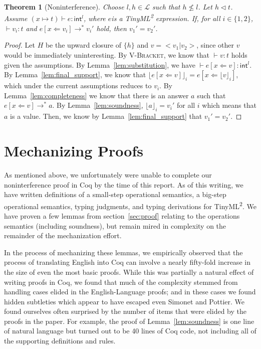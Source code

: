\documentclass[a4paper,twocolumn]{article}
\newcommand{\langName}[0]{TinyML\textsuperscript{2}}
\newcommand{\typeRule}[3]{#1 \vdash #2 \colon #3}
\newcommand{\guards}[0]{\lhd}
\newcommand{\lift}[1]{\lfloor #1 \rfloor}
\theoremstyle{plain}
\newtheorem{thm}{Theorem}
\theoremstyle{definition}
\begin{document}
\begin{thm}[Noninterference]
  Choose $l, h \in \mathcal{L}$ such that $h \not\leq l$.  Let $h \guards t$.
  Assume $\typeRule{(x \mapsto t)}{e}{\textsf{int}^l}$, where $e$is a \langName
  expression.  If, for all $i \in \{1, 2\}$, $\typeRule{ }{v_i}{t}$ and $e[x
  \Leftarrow v_i] \to^* v_i'$ hold, then $v_1' = v_2'$.
\end{thm}
\begin{proof}
  Let $H$ be the upward closure of $\{h\}$ and $v = < v_1 | v_2 >$, since other
  $v$ would be immediately uninteresting.  By \textsc{V-Bracket}, we know that
  $\typeRule{ }{v}{t}$ holds given the assumptions.
  By Lemma~\ref{lem:substitution}, we have $\typeRule{ }{e[x \Leftarrow
  v]}{\textsf{int}^l}$.  By Lemma~\ref{lem:final_support}, we know that
  $\lift{e[x \Leftarrow v]}_i = e[x \Leftarrow \lift{v}_i]$, which under the
  current assumptions reduces to $v_i$.  By Lemma~\ref{lem:completeness} we know
  that there is an answer $a$ such that $e[x \Leftarrow v] \to^* a$.  By
  Lemma~\ref{lem:soundness}, $\lift{a}_i = v_i'$ for all $i$ which means that
  $a$ is a value.  Then, we know by Lemma~\ref{lem:final_support} that $v_1' =
  v_2'$.
\end{proof}

\section{Mechanizing Proofs}
\label{sec:mechanizing}

As mentioned above, we unfortunately were unable to complete our noninterference
proof in Coq by the time of this report.  As of this writing, we have written definitions of a small-step operational semantics, a big-step operational semantics, typing judgments, and typing derivations for \langName.  We have proven a few lemmas from section~\ref{sec:proof} relating to the operations semantics (including soundness), but remain mired in complexity on the remainder of the mechanization effort.  

In the process of mechanizing these lemmas, we empirically observed that the process of translating English into Coq can involve a nearly fifty-fold increase in the size of even the most basic proofs.  While this was partially a natural effect of writing proofs in Coq, we found that much of the complexity stemmed from handling cases elided in the English-Language proofs; and in these cases we found hidden subtleties which appear to have escaped even Simonet and Pottier. We found ourselves
often surprised by the number of items that were elided by the proofs in the
paper.  For example, the proof of Lemma~\ref{lem:soundness} is one line of
natural language but turned out to be 40 lines of Coq code, not including all of
the supporting definitions and rules.
\end{document}
